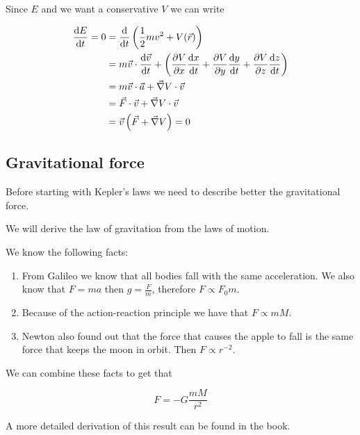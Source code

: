 \documentclass[10pt]{extarticle}
\begin{document}
Since $E$ and we want a conservative $V$ we can write

\begin{align*}
    \dv{E}{t} = 0 & = \dv{t} \left( \frac{1}{2} m v^2 + V(\vec{r}) \right)                                                              \\
                  & = m \vec{v} \cdot \dv{\vec{v}}{t} + \left(\pdv{V}{x} \dv{x}{t} + \pdv{V}{y} \dv{y}{t} + \pdv{V}{z} \dv{z}{t}\right) \\
                  & = m \vec{v} \cdot \vec{a} + \vec{\nabla} V \cdot \vec{v}                                                            \\
                  & = \vec{F} \cdot \vec{v} + \vec{\nabla} V \cdot \vec{v}                                                              \\
                  & = \vec{v}\left(\vec{F} + \vec{\nabla} V\right) = 0                                                                  \\
\end{align*}

\subsection{Gravitational force}

Before starting with Kepler's laws we need to describe better the gravitational force.

We will derive the law of gravitation from the laws of motion.

We know the following facts:

\begin{enumerate}
    \item From Galileo we know that all bodies fall with the same acceleration.
          We also know that $F = ma$ then $g = \frac{F}{m}$, therefore $F \propto F_0 m$.
    \item Because of the action-reaction principle we have that $F \propto m M$.
    \item Newton also found out that the force that causes the apple to fall is the same force that keeps the moon in orbit.
          Then $F \propto r^{-2}$.
\end{enumerate}

We can combine these facts to get that

$$
    F = - G \frac{m M}{r^2}
$$

A more detailed derivation of this result can be found in the book.
\end{document}

